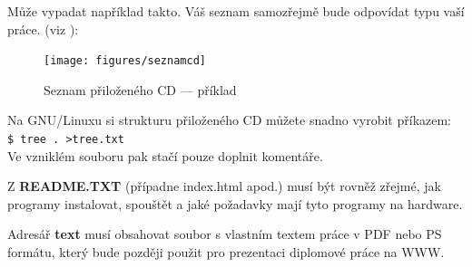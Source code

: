 \documentclass[11pt,twoside,a4paper]{book}
\begin{document}
Může vypadat například takto. Váš seznam samozřejmě bude odpovídat typu vaší práce. (viz \cite{infodp}):

\begin{figure}[h]
\begin{center}
\texttt{[image: figures/seznamcd]}
\caption{Seznam přiloženého CD --- příklad}
\label{fig:seznamcd}
\end{center}
\end{figure}

Na GNU/Linuxu si strukturu přiloženého CD můžete snadno vyrobit příkazem:\\ 
\verb|$ tree . >tree.txt|\\
Ve vzniklém souboru pak stačí pouze doplnit komentáře.

Z \textbf{README.TXT} (případne index.html apod.)  musí být rovněž zřejmé, jak programy instalovat, spouštět a jaké požadavky mají tyto programy na hardware.

Adresář \textbf{text}  musí obsahovat soubor s vlastním textem práce v PDF nebo PS formátu, který bude později použit pro prezentaci diplomové práce na WWW.
\end{document}
